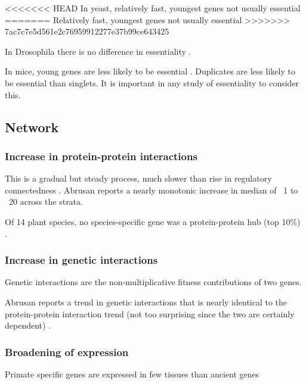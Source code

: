 <<<<<<< HEAD
        In yeast, relatively fast, youngest genes not usually essential
        \cite{abrusan_integration_2013}
=======
    Relatively fast, youngest genes not usually essential
    \cite{abrusan_integration_2013}
>>>>>>> 7ac7c7e5d561e2c76959912277e37b99ce643425

    In Drosophila there is no difference in essentiality
    \cite{chen_new_2010}. 

    In mice, young genes are less likely to be essential
    \cite{chen_younger_2012}. Duplicates are less likely to be essential
    than singlets. It is important in any study of essentiality to consider
    this.



    \FloatBarrier

\subsection{Network}

  \subsubsection{Increase in protein-protein interactions}

    This is a gradual but steady process, much slower than rise in
    regulatory connectedness \cite{abrusan_integration_2013}. Abrusan
    reports a nearly monotonic increase in median of ~1 to ~20 across
    the strata.

    Of 14 plant species, no species-specific gene was a protein-protein
    hub (top 10\%) \cite{ye_evolutionary_2013}.

    \FloatBarrier

  \subsubsection{Increase in genetic interactions}

    Genetic interactions are the non-multiplicative fitness
    contributions of two genes.

    Abrusan reports a trend in genetic interactions that is nearly
    identical to the protein-protein interaction trend (not too
    surprising since the two are certainly dependent)
    \cite{abrusan_integration_2013}.

  \subsubsection{Broadening of expression}

    Primate specific genes are expressed in few tissues than ancient
    genes \cite{toll-riera_origin_2009}

